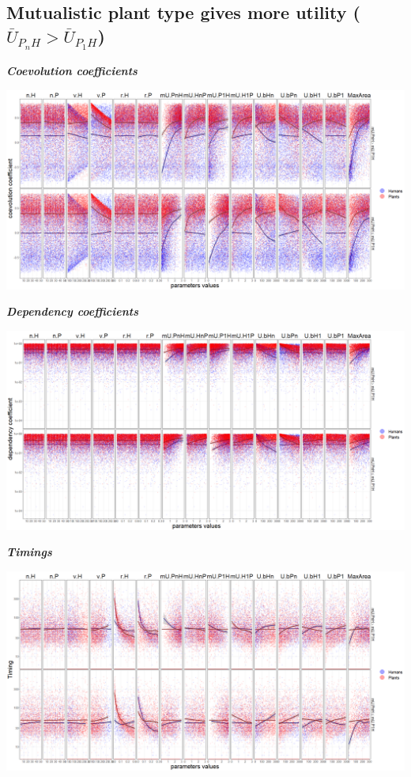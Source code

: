 \documentclass[
]{book}
\begin{document}
\newpage

\hypertarget{mutualistic-plant-type-gives-more-utility-baru_p_nh-baru_p_1h}{%
\subsection{\texorpdfstring{Mutualistic plant type gives more utility (\(\bar{U}_{P_{n}H}> \bar{U}_{P_{1}H}\))}{Mutualistic plant type gives more utility (\textbackslash bar\{U\}\_\{P\_\{n\}H\}\textgreater{} \textbackslash bar\{U\}\_\{P\_\{1\}H\})}}\label{mutualistic-plant-type-gives-more-utility-baru_p_nh-baru_p_1h}}


\textbf{\emph{Coevolution coefficients}}

\includegraphics[width=1\linewidth]{plots/5_multiplePar-coevo-plantImprove-ggplot}

\textbf{\emph{Dependency coefficients}}

\includegraphics[width=1\linewidth]{plots/5_multiplePar-depend-plantImprove-ggplot}

\textbf{\emph{Timings}}

\includegraphics[width=1\linewidth]{plots/5_multiplePar-timing-plantImprove-ggplot}
\end{document}

